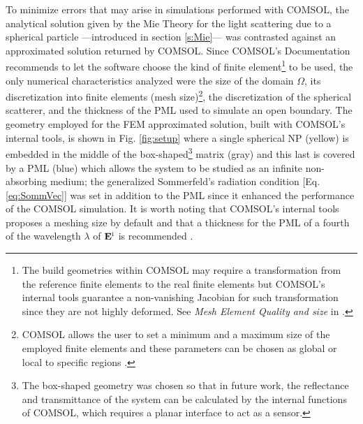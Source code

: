 To minimize errors that may arise in simulations performed with COMSOL, the analytical solution given by the Mie Theory for the light scattering due to a spherical particle ---introduced in section \ref{s:Mie}--- was contrasted against an approximated solution returned by COMSOL. Since COMSOL's Documentation \cite{comsol_doc} recommends to let the software choose the kind of finite element\footnote{The build geometries within COMSOL may require a transformation from the reference finite elements to the real finite elements but COMSOL's internal tools guarantee a non-vanishing Jacobian for such transformation since they are not highly deformed. See \textit{Mesh Element Quality and size} in \cite{comsol_doc}.} to be used, the only numerical characteristics analyzed were the size of the domain $\Omega$, its discretization into finite elements (mesh size)\footnote{COMSOL allows the user to set a minimum and a maximum size of the employed finite elements and these parameters can be chosen as global or local to specific regions \cite{comsol_doc}.}, the discretization of the spherical scatterer, and the thickness of the PML used to simulate an open boundary. The geometry employed for the FEM approximated solution, built with COMSOL's internal tools, is shown in Fig. \ref{fig:setup} where a single spherical NP (yellow) is embedded in  the middle of the box-shaped\footnote{The box-shaped geometry was chosen so that in future work, the reflectance and transmittance of the system can be calculated by the internal functions of COMSOL, which requires a planar interface to act as a sensor.} matrix (gray) and this last is covered by a PML (blue) which allows the system to be studied as an infinite non-absorbing medium; the generalized Sommerfeld's radiation condition [Eq. \eqref{eq:SommVec}] was set in addition to the PML since it enhanced the performance of the COMSOL simulation. It is worth noting that COMSOL's internal tools proposes a meshing size by default \cite{comsol_doc} and that a thickness for the PML of a fourth of the wavelength $\lambda$ of $\vb{E}^\text{i}$ is recommended \cite{comsol_wave}.

